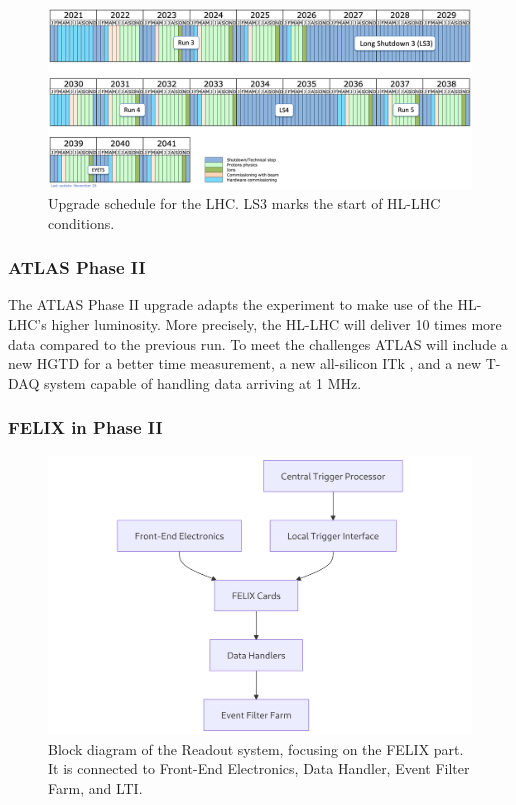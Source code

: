 \begin{figure}[H]
\centering
\includegraphics[width=\textwidth]{images/introduction/LHC-schedule.png}
\caption[Upgrade schedule for the LHC]{Upgrade schedule for the LHC. LS3 marks the start of HL-LHC conditions. \protect\cite{lhc_upgrade_schedule}}
\label{fig:LHC-schedule}
\end{figure}

\subsubsection{\acs{ATLAS} Phase II}

The \acs{ATLAS} Phase II upgrade \cite{Affolder:2799535} adapts the experiment to make use of the \acs{HL-LHC}'s higher luminosity. 
More precisely, the \acs{HL-LHC} will deliver 10 times more data compared to the previous run.  To meet the challenges \acs{ATLAS} will include a new \acf{HGTD} \cite{hgtd-phase2-upgrade} for a better time measurement, a new all-silicon \acf{ITk} \cite{atlas-itk-pixel-detector}, and a new \acs{T-DAQ} system capable of handling data arriving at 1 MHz.

\subsubsection{\acs{FELIX} in Phase II}

\begin{figure}[H]
\centering
\includegraphics[width=\textwidth]{images/introduction/felix-block-diagram.png}
\caption[Block diagram of the Readout system]{Block diagram of the Readout system, focusing on the FELIX part. It is connected to Front-End Electronics, Data Handler, Event Filter Farm, and \acf{LTI}.}
\label{fig:felix-block-diagram}
\end{figure}

